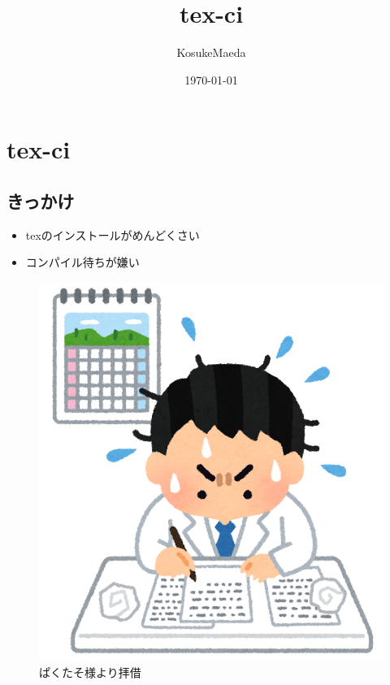 \documentclass[a4j,12pt]{jreport}
\title{tex-ci}
\author{KosukeMaeda}
\date{\today}
\begin{document}
\maketitle

\chapter{tex-ci}
\section{きっかけ}
\begin{itemize}
\item texのインストールがめんどくさい
\item コンパイル待ちが嫌い
\end{itemize}

\begin{figure}[tbp]
  \begin{center}
    \includegraphics[width=0.5\linewidth]{figures/shimekiri_report_hakui_man.png}
  \end{center}
  \caption{ぱくたそ様より拝借}
\end{figure}


\nocite{*}

\end{document}
